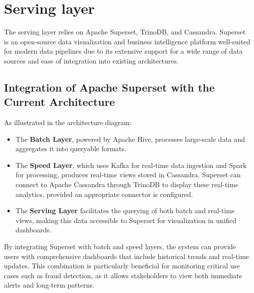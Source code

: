 \documentclass[12pt,a4paper, hidelinks]{article}
\begin{document}
\section{Serving layer}

The serving layer relies on Apache Superset, TrinoDB, and Cassandra. Superset is an open-source data visualization and business intelligence platform well-suited for modern data pipelines due to its extensive support for a wide range of data sources and ease of integration into existing architectures.

\subsection{Integration of Apache Superset with the Current Architecture}
As illustrated in the architecture diagram:
\begin{itemize}
    \item The \textbf{Batch Layer}, powered by Apache Hive, processes large-scale data and aggregates it into queryable formats.
    \item The \textbf{Speed Layer}, which uses Kafka for real-time data ingestion and Spark for processing, produces real-time views stored in Cassandra. Superset can connect to Apache Cassandra through TrinoDB to display these real-time analytics, provided an appropriate connector is configured.
    \item The \textbf{Serving Layer} facilitates the querying of both batch and real-time views, making this data accessible to Superset for visualization in unified dashboards.
\end{itemize}

By integrating Superset with batch and speed layers, the system can provide users with comprehensive dashboards that include historical trends and real-time updates. This combination is particularly beneficial for monitoring critical use cases such as fraud detection, as it allows stakeholders to view both immediate alerts and long-term patterns.
\end{document}
